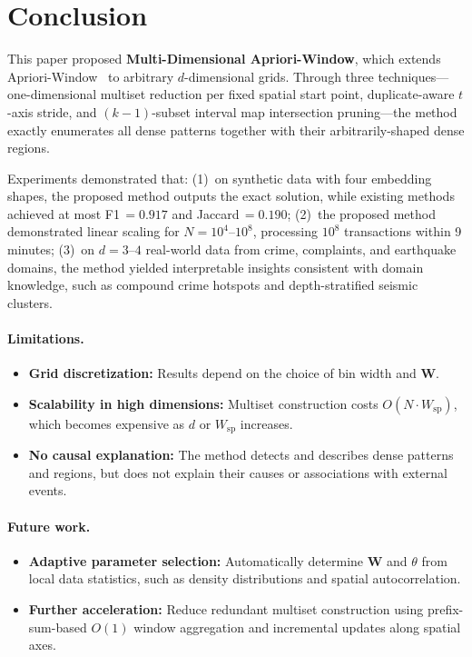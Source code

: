 \section{Conclusion}\label{sec:conclusion}

This paper proposed \textbf{Multi-Dimensional Apriori-Window},
which extends Apriori-Window~\cite{aprioriwindow}
to arbitrary $d$-dimensional grids.
Through three techniques---one-dimensional multiset reduction
per fixed spatial start point,
duplicate-aware $t$-axis stride,
and $(k{-}1)$-subset interval map intersection pruning---the method
exactly enumerates all dense patterns
together with their arbitrarily-shaped dense regions.

Experiments demonstrated that:
(1)~on synthetic data with four embedding shapes,
the proposed method outputs the exact solution,
while existing methods achieved at most
F1\,$=0.917$ and Jaccard\,$=0.190$;
(2)~the proposed method demonstrated linear scaling
for $N = 10^4$--$10^8$,
processing $10^8$ transactions within 9 minutes;
(3)~on $d{=}3$--$4$ real-world data from crime, complaints,
and earthquake domains,
the method yielded interpretable insights
consistent with domain knowledge,
such as compound crime hotspots
and depth-stratified seismic clusters.

\paragraph{Limitations.}
\begin{itemize}
    \item \textbf{Grid discretization:} Results depend on the choice of bin width and $\bm{W}$.
    \item \textbf{Scalability in high dimensions:} Multiset construction costs $O(N \cdot W_{\mathrm{sp}})$, which becomes expensive as $d$ or $W_{\mathrm{sp}}$ increases.
    \item \textbf{No causal explanation:} The method detects and describes dense patterns and regions, but does not explain their causes or associations with external events.
\end{itemize}

\paragraph{Future work.}
\begin{itemize}
    \item \textbf{Adaptive parameter selection:} Automatically determine $\bm{W}$ and $\theta$ from local data statistics, such as density distributions and spatial autocorrelation.
    \item \textbf{Further acceleration:} Reduce redundant multiset construction using prefix-sum-based $O(1)$ window aggregation and incremental updates along spatial axes.
\end{itemize}
